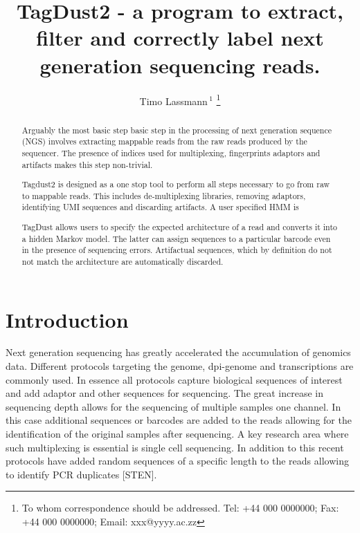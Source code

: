\documentclass[a4,center,fleqn]{NAR}
\begin{document}
\title{TagDust2 - a program to extract, filter and correctly label next generation sequencing reads.}

\author{%
Timo Lassmann\,$^{1}$%
\footnote{To whom correspondence should be addressed.
Tel: +44 000 0000000; Fax: +44 000 0000000; Email: xxx@yyyy.ac.zz}}

\address{%
$^{1}$Division of Genomic Technologies, Center for Life Science Technologies,
RIKEN Yokohama Institute
1-7-22 Suehiro-cho, Tsurumi-ku, Yokohama
230-0045 Kanagawa, Japan 
}


\maketitle

\begin{abstract}

Arguably the most basic step basic step in the processing of next generation sequence (NGS) involves extracting mappable reads from the raw reads produced by the sequencer. The presence of indices used for multiplexing, fingerprints adaptors and artifacts makes this step non-trivial. 

Tagdust2 is designed as a one stop tool to perform all steps necessary to go from raw to mappable reads. This includes de-multiplexing libraries, removing adaptors, identifying UMI sequences and discarding artifacts. A user specified HMM is 

TagDust allows users to specify the expected architecture of a read and converts it into a hidden Markov model. The latter can assign sequences to a particular barcode even in the presence of sequencing errors. Artifactual sequences, which by definition do not not match the architecture are automatically discarded.

\end{abstract}

\section{Introduction}

Next generation sequencing has greatly accelerated the accumulation of genomics data. Different protocols targeting the genome, dpi-genome and transcriptions are commonly used. In essence all protocols capture biological sequences of interest and add adaptor and other sequences for sequencing. The great increase in sequencing depth allows for the sequencing of multiple samples one channel. In this case additional sequences or barcodes are added to the reads allowing for the identification of the original samples after sequencing. A key research area where such multiplexing is essential is single cell sequencing. In addition to this recent protocols have added random sequences of a specific length to the reads allowing to identify PCR duplicates [STEN]. 
\end{document}
